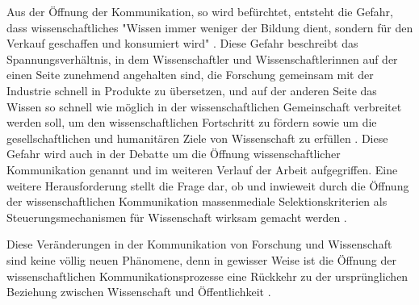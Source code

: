 Aus der Öffnung der Kommunikation, so wird befürchtet, entsteht die Gefahr, dass wissenschaftliches "Wissen immer weniger der Bildung dient, sondern für den Verkauf geschaffen und konsumiert wird" \cite{hagner_2015_sache_buches}. Diese Gefahr beschreibt das Spannungsverhältnis, in dem Wissenschaftler und Wissenschaftlerinnen auf der einen Seite zunehmend angehalten sind, die Forschung gemeinsam mit der Industrie schnell in Produkte zu übersetzen, und auf der anderen Seite das Wissen so schnell wie möglich in der wissenschaftlichen Gemeinschaft verbreitet werden soll, um den wissenschaftlichen Fortschritt zu fördern sowie um die gesellschaftlichen und humanitären Ziele von Wissenschaft zu erfüllen \cite{harmon_2012_commercialization} \cite{Woelfle_2011}. Diese Gefahr wird auch in der Debatte um die Öffnung wissenschaftlicher Kommunikation genannt \cite{Kansa_2014_open_neoliberalism} \cite{bunz_2013_open} \cite{tkacz_2012_open} \cite{mirowski_2005_contract} und im weiteren Verlauf der Arbeit aufgegriffen. Eine weitere Herausforderung stellt die Frage dar, ob und inwieweit durch die Öffnung der wissenschaftlichen Kommunikation massenmediale Selektionskriterien als Steuerungsmechanismen für Wissenschaft wirksam gemacht werden \cite{bbaw_publizieren_2015}.

Diese Veränderungen in der Kommunikation von Forschung und Wissenschaft sind keine völlig neuen Phänomene, denn in gewisser Weise ist die Öffnung der wissenschaftlichen Kommunikationsprozesse eine Rückkehr zu der ursprünglichen Beziehung zwischen Wissenschaft und Öffentlichkeit \cite{Konneker_2013} \cite{weingart_2005_wissenschaft}.

